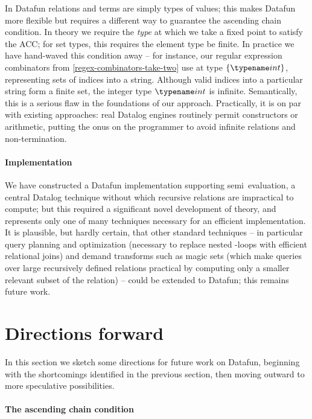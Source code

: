 In Datafun relations and terms are simply types of values; this makes Datafun more flexible but requires a different way to guarantee the ascending chain condition.
%
In theory we require the \emph{type} at which we take a fixed point to satisfy the ACC; for set types, this requires the element type be finite.
%
In practice we have hand-waved this condition away -- for instance, our regular
expression combinators from \cref{regex-combinators-take-two} use  at
type $\tset{\tint}$, representing sets of indices into a string. Although valid
indices into a particular string form a finite set, the integer type $\tint$ is
infinite.
%
Semantically, this is a serious flaw in the foundations of our approach.
%
Practically, it is on par with existing approaches: real Datalog engines routinely permit constructors or arithmetic, putting the onus on the programmer to avoid infinite relations and non-termination.

\paragraph{Implementation}

We have constructed a Datafun implementation supporting semi\naive\ evaluation,
a central Datalog technique without which recursive relations are impractical to
compute; but this required a significant novel development of theory, and
represents only one of many techniques necessary for an efficient
implementation. It is plausible, but hardly certain, that other standard
techniques -- in particular query planning and optimization (necessary to
replace nested -loops with efficient relational joins) and demand
transforms such as magic sets (which make queries over large recursively
defined relations practical by computing only a smaller relevant subset of the
relation) -- could be extended to Datafun; this remains future work.


\section{Directions forward}

\label{section-extensions}

In this section we sketch some directions for future work on Datafun, beginning with the shortcomings identified in the previous section, then moving outward to more speculative possibilities.

\paragraph{The ascending chain condition}

